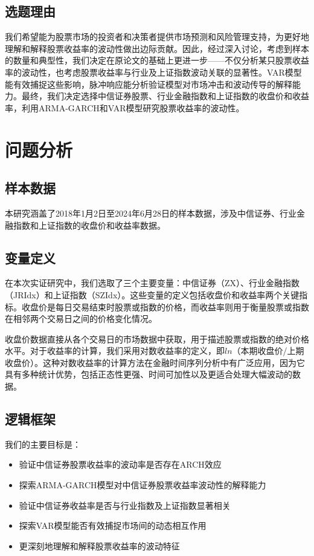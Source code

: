 \documentclass[12pt]{article}
\begin{document}
\subsection{选题理由}
我们希望能为股票市场的投资者和决策者提供市场预测和风险管理支持，为更好地理解和解释股票收益率的波动性做出边际贡献。因此，经过深入讨论，考虑到样本的数量和典型性，我们决定在原论文的基础上更进一步——不仅分析某只股票收益率的波动性，也考虑股票收益率与行业及上证指数波动关联的显著性。VAR模型能有效捕捉这些影响，脉冲响应能分析验证模型对市场冲击和波动传导的解释能力。最终，我们决定选择中信证券股票、行业金融指数和上证指数的收盘价和收益率，利用ARMA-GARCH和VAR模型研究股票收益率的波动性。


\section{问题分析}

\subsection{样本数据}

本研究涵盖了2018年1月2日至2024年6月28日的样本数据，涉及中信证券、行业金融指数和上证指数的收盘价和收益率数据。

\subsection{变量定义}

在本次实证研究中，我们选取了三个主要变量：中信证券（ZX）、行业金融指数（JRIdx）和上证指数（SZIdx）。这些变量的定义包括收盘价和收益率两个关键指标。收盘价是每日交易结束时股票或指数的价格，而收益率则用于衡量股票或指数在相邻两个交易日之间的价格变化情况。

收盘价数据直接从各个交易日的市场数据中获取，用于描述股票或指数的绝对价格水平。对于收益率的计算，我们采用对数收益率的定义，即$ln$（本期收盘价/上期收盘价）。这种对数收益率的计算方法在金融时间序列分析中有广泛应用，因为它具有多种统计优势，包括正态性更强、时间可加性以及更适合处理大幅波动的数据。

\subsection{逻辑框架}
我们的主要目标是：

\begin{itemize}
    \item 验证中信证券股票收益率的波动率是否存在ARCH效应
    \item 探索ARMA-GARCH模型对中信证券股票收益率波动性的解释能力
    \item 验证中信证券收益率是否与行业指数及上证指数显著相关
    \item 探索VAR模型能否有效捕捉市场间的动态相互作用
    \item 更深刻地理解和解释股票收益率的波动特征
\end{itemize}
\end{document}
